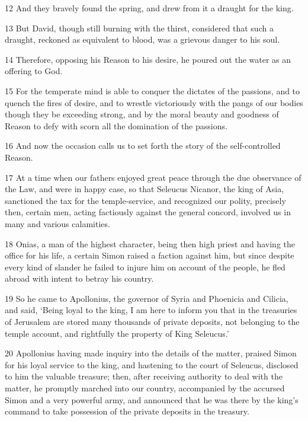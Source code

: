 \par 12 And they bravely found the spring, and drew from it a draught for the king.

\par 13 But David, though still burning with the thirst, considered that such a draught, reckoned as equivalent to blood, was a grievous danger to his soul.

\par 14 Therefore, opposing his Reason to his desire, he poured out the water as an offering to God.

\par 15 For the temperate mind is able to conquer the dictates of the passions, and to quench the fires of desire, and to wrestle victoriously with the pangs of our bodies though they be exceeding strong, and by the moral beauty and goodness of Reason to defy with scorn all the domination of the passions.

\par 16 And now the occasion calls us to set forth the story of the self-controlled Reason.

\par 17 At a time when our fathers enjoyed great peace through the due observance of the Law, and were in happy case, so that Seleucus Nicanor, the king of Asia, sanctioned the tax for the temple-service, and recognized our polity, precisely then, certain men, acting factiously against the general concord, involved us in many and various calamities.

\par 18 Onias, a man of the highest character, being then high priest and having the office for his life, a certain Simon raised a faction against him, but since despite every kind of slander he failed to injure him on account of the people, he fled abroad with intent to betray his country.

\par 19 So he came to Apollonius, the governor of Syria and Phoenicia and Cilicia, and said, ‘Being loyal to the king, I am here to inform you that in the treasuries of Jerusalem are stored many thousands of private deposits, not belonging to the temple account, and rightfully the property of King Seleucus.’

\par 20 Apollonius having made inquiry into the details of the matter, praised Simon for his loyal service to the king, and hastening to the court of Seleucus, disclosed to him the valuable treasure; then, after receiving authority to deal with the matter, he promptly marched into our country, accompanied by the accursed Simon and a very powerful army, and announced that he was there by the king's command to take possession of the private deposits in the treasury.

